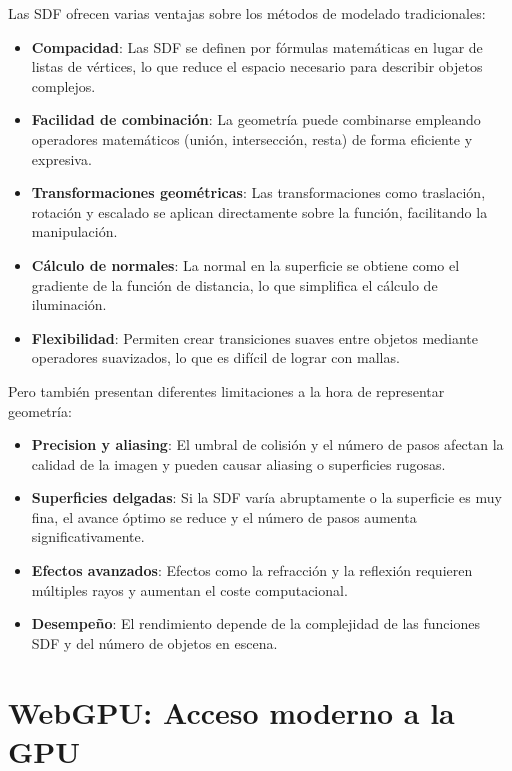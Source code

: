 Las SDF ofrecen varias ventajas sobre los métodos de modelado tradicionales:

\begin{itemize}
    \item \textbf{Compacidad}: Las SDF se definen por fórmulas matemáticas en lugar de listas de vértices, lo que reduce el espacio necesario para describir objetos complejos.
    \item \textbf{Facilidad de combinación}: La geometría puede combinarse empleando operadores matemáticos (unión, intersección, resta) de forma eficiente y expresiva.
    \item \textbf{Transformaciones geométricas}: Las transformaciones como traslación, rotación y escalado se aplican directamente sobre la función, facilitando la manipulación.
    \item \textbf{Cálculo de normales}: La normal en la superficie se obtiene como el gradiente de la función de distancia, lo que simplifica el cálculo de iluminación.
    \item \textbf{Flexibilidad}: Permiten crear transiciones suaves entre objetos mediante operadores suavizados, lo que es difícil de lograr con mallas.
\end{itemize}

Pero también presentan diferentes limitaciones a la hora de representar geometría:

\begin{itemize}
    \item \textbf{Precision y aliasing}: El umbral de colisión y el número de pasos afectan la calidad de la imagen y pueden causar aliasing o superficies rugosas.
    \item \textbf{Superficies delgadas}: Si la SDF varía abruptamente o la superficie es muy fina, el avance óptimo se reduce y el número de pasos aumenta significativamente.
    \item \textbf{Efectos avanzados}: Efectos como la refracción y la reflexión requieren múltiples rayos y aumentan el coste computacional.
    \item \textbf{Desempeño}: El rendimiento depende de la complejidad de las funciones SDF y del número de objetos en escena.
\end{itemize}

\section{WebGPU: Acceso moderno a la GPU}

